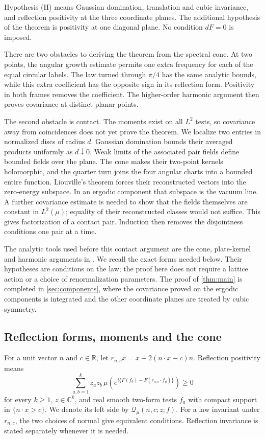 \documentclass[11pt,letterpaper,reqno]{amsart}
\theoremstyle{definition}
\theoremstyle{remark}
\newcommand{\R}{\mathbb R}\newcommand{\C}{\mathbb C}
\begin{document}
Hypothesis (H) means Gaussian domination, translation and cubic
invariance, and reflection positivity at the three coordinate planes.
The additional hypothesis of the theorem is positivity
at one diagonal plane. No condition $dF=0$ is imposed.

There are two obstacles to deriving the theorem from the spectral cone.
At two points, the angular growth estimate permits one extra frequency
for each of the equal circular labels. The law turned through $\pi/4$
has the same analytic bounds, while this extra coefficient has the
opposite sign in its reflection form. Positivity in both frames removes
the coefficient. The higher-order harmonic argument then proves
covariance at distinct planar points.

The second obstacle is contact. The moments exist on all $L^2$ tests,
so covariance away from coincidences does not yet prove the theorem.
We localize two entries in normalized discs of radius $d$. Gaussian
domination bounds their averaged products uniformly as $d\downarrow0$.
Weak limits of the associated pair fields define bounded fields over
the plane. The cone makes their
two-point kernels holomorphic, and the quarter turn joins the four
angular charts into a bounded entire function. Liouville's theorem
forces their reconstructed vectors into the zero-energy subspace.
In an ergodic component that subspace is the vacuum line. A further
covariance estimate is needed to show that the fields themselves are
constant in $L^2(\mu)$; equality of their reconstructed classes would
not suffice. This gives factorization of a contact pair. Induction then
removes the disjointness conditions one pair at a time.

The analytic tools used before this contact argument are the cone,
plate-kernel and harmonic arguments in \cite[Sections~7--8]{QEDCurrent}.
We recall the exact
forms needed below. Their hypotheses are conditions on the law; the
proof here does not require a lattice action or a choice of
renormalization parameters.
The proof of \cref{thm:main} is completed in \cref{sec:components},
where the covariance proved on the ergodic components is integrated
and the other coordinate planes are treated by cubic symmetry.

\subsection{Reflection forms, moments and the cone}

For a unit vector $n$ and $c\in\R$, let
$r_{n,c}x=x-2(n\cdot x-c)n$. Reflection positivity means
\begin{equation}\label{eq:rp}
 \sum_{a,b=1}^k\overline{z_a}z_b\,
 \mu\!\left(e^{i\{F(f_b)-F(r_{n,c}\cdot f_a)\}}\right)\ge0
\end{equation}
for every $k\ge1$, $z\in\C^k$, and real smooth two-form tests $f_a$
with compact support in $\{n\cdot x>c\}$. We denote its left side by
$\mathcal Q_\mu(n,c;z;f)$.
For a law invariant under $r_{n,c}$, the two choices of normal give
equivalent conditions. Reflection invariance is stated separately
whenever it is needed.
\end{document}
